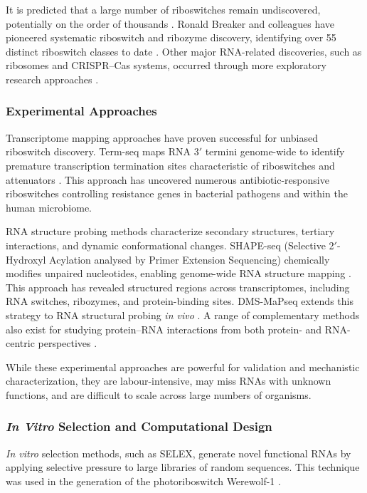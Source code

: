 \documentclass{article}
\begin{document}
It is predicted that a large number of riboswitches remain undiscovered, potentially on the order of thousands \parencite{Kavita2023}.
Ronald Breaker and colleagues have pioneered systematic riboswitch and ribozyme discovery, identifying over 55 distinct riboswitch classes to date \parencite{Breaker2022}.
Other major RNA-related discoveries, such as ribosomes and CRISPR--Cas systems, occurred through more exploratory research approaches \parencite{Brück2025}.

\subsubsection*{Experimental Approaches}

Transcriptome mapping approaches have proven successful for unbiased riboswitch discovery.
Term-seq maps RNA 3$'$ termini genome-wide to identify premature transcription termination sites characteristic of riboswitches and attenuators \parencite{Dar2016}.
This approach has uncovered numerous antibiotic-responsive riboswitches controlling resistance genes in bacterial pathogens and within the human microbiome.

RNA structure probing methods characterize secondary structures, tertiary interactions, and dynamic conformational changes.
SHAPE-seq (Selective 2$'$-Hydroxyl Acylation analysed by Primer Extension Sequencing) chemically modifies unpaired nucleotides, enabling genome-wide RNA structure mapping \parencite{Lucks2011}.
This approach has revealed structured regions across transcriptomes, including RNA switches, ribozymes, and protein-binding sites.
DMS-MaPseq extends this strategy to RNA structural probing \emph{in vivo} \parencite{Zubradt2017}.
A range of complementary methods also exist for studying protein--RNA interactions from both protein- and RNA-centric perspectives \parencite{Yi2025}.

While these experimental approaches are powerful for validation and mechanistic characterization, they are labour-intensive, may miss RNAs with unknown functions, and are difficult to scale across large numbers of organisms.

\subsubsection*{\emph{In Vitro} Selection and Computational Design}

\emph{In vitro} selection methods, such as SELEX, generate novel functional RNAs by applying selective pressure to large libraries of random sequences.
This technique was used in the generation of the photoriboswitch Werewolf-1 \parencite{Rotstan2020}.
\end{document}
